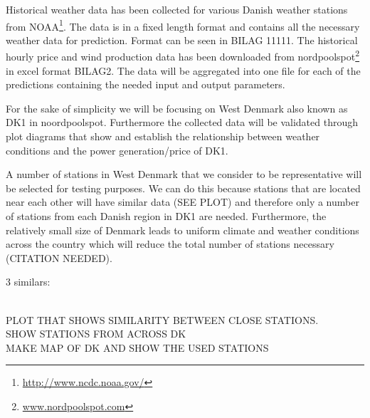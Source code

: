 Historical weather data has been collected for various Danish weather stations from NOAA\footnote{\url{http://www.ncdc.noaa.gov/}}. The data is in a fixed length format and contains all the necessary weather data for prediction. Format can be seen in BILAG 11111. 
The historical hourly price and wind production data has been downloaded from nordpoolspot\footnote{\url{www.nordpoolspot.com}} in excel format BILAG2.
The data will be aggregated into one file for each of the predictions containing the needed input and output parameters.

For the sake of simplicity we will be focusing on West Denmark also known as DK1 in noordpoolspot. Furthermore the collected data will be validated through plot diagrams that show and establish the relationship between weather conditions and the power generation/price of DK1.

A number of stations in West Denmark that we consider to be representative will be selected for testing purposes. We can do this because stations that are located near each other will have similar data (SEE PLOT) and therefore only a number of stations from each Danish region in DK1 are needed. Furthermore, the relatively small size of Denmark leads to uniform climate and weather conditions across the country which will reduce the total number of stations necessary (CITATION NEEDED).

3 similars:


\\[0.5cm]
PLOT THAT SHOWS SIMILARITY BETWEEN CLOSE STATIONS.
\\[0.5cm]
SHOW STATIONS FROM ACROSS DK
\\[0.5cm]
MAKE MAP OF DK AND SHOW THE USED STATIONS